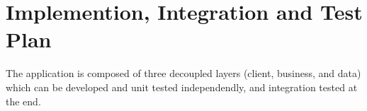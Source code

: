 
\section{Implemention, Integration and Test Plan}

The application is composed of three decoupled layers (client, business, and data) which can be developed and unit tested independendly, and integration tested at the end. 
